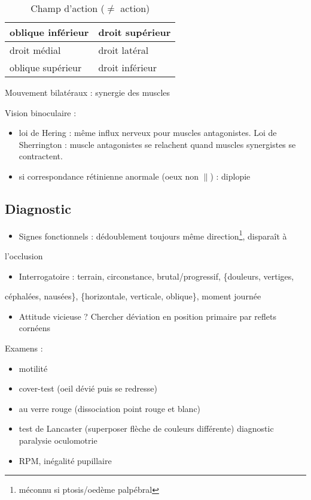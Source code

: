 \documentclass[11pt]{article}
\begin{document}
\begin{table}[htbp]
\caption{Champ d'action (\danger \(\ne\) action)}
\centering
\begin{tabular}{ll}
\toprule
oblique inférieur & droit supérieur\\
\midrule
droit médial & droit latéral\\
\midrule
oblique supérieur & droit inférieur\\
\bottomrule
\end{tabular}
\end{table}

Mouvement bilatéraux : synergie des muscles

Vision binoculaire :
\begin{itemize}
\item loi de Hering : même influx nerveux pour muscles antagonistes. Loi de
Sherrington : muscle antagonistes se relachent quand muscles synergistes se
contractent.
\item si correspondance rétinienne anormale (oeux non \(\parallel\)) : diplopie
\end{itemize}

\subsection{Diagnostic}
\label{sec:org7f4de1c}
\begin{itemize}
\item Signes fonctionnels : dédoublement toujours même direction\footnote{\danger méconnu si ptosis/oedème palpébral}, disparaît à
\end{itemize}
l'occlusion
\begin{itemize}
\item Interrogatoire : terrain, circonstance, brutal/progressif, \{douleurs, vertiges,
\end{itemize}
céphalées, nausées\}, \{horizontale, verticale, oblique\}, moment journée
\begin{itemize}
\item Attitude vicieuse ? Chercher déviation en position primaire par reflets
cornéens
\end{itemize}

Examens :
\begin{itemize}
\item motilité
\item cover-test (oeil dévié puis se redresse)
\item au verre rouge (dissociation point rouge et blanc)
\item test de Lancaster (superposer flèche de couleurs différente) \thus diagnostic
paralysie oculomotrie
\item RPM, inégalité pupillaire
\end{itemize}
\end{document}

